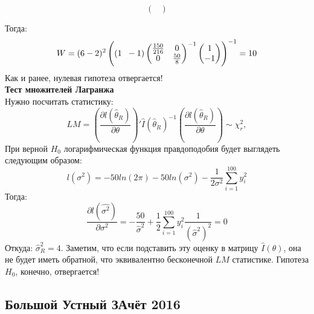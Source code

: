 \documentclass[12pt, a4paper]{article}
\theoremstyle{definition}
\begin{document}
\begin{enumerate}
\[\begin{pmatrix}
\end{pmatrix}
\]

Тогда:
\[
W = (6-2)^2\left((1 \hspace{2mm} -1) \begin{pmatrix}
\frac{150}{216} & 0 \\
0 & \frac{50}{8}
\end{pmatrix}^{-1}
 \begin{pmatrix}
1 \\
-1
\end{pmatrix} \right)^{-1} = 10
\]
Как и ранее, нулевая гипотеза отвергается! \\
\textbf{Тест множителей Лагранжа}\\
Нужно посчитать статистику:
\[
LM = \left(\frac{\partial l(\hat{\theta}_R)}{\partial \theta}\right)'\hat{I}(\hat{\theta}_R)^{-1}\left(\frac{\partial l(\hat{\theta}_R)}{\partial \theta}\right) \sim \chi^2_r,
\]
При верной $H_0$ логарифмическая функция правдоподобия будет выглядеть следующим образом:
\[
l(\sigma^2) = -50ln(2\pi) - 50ln(\sigma^2) - \frac{1}{2\sigma^2}\sum \limits_{i=1}^{100}y_i^2
\]
Тогда:
\[
\frac{\partial l(\hat{\sigma^2})}{\partial \sigma^2} = -\frac{50}{\hat{\sigma}^2} + \frac{1}{2}\sum\limits_{i=1}^{100}y_i^2\frac{1}{(\hat{\sigma}^2)^2} = 0
\]
Откуда: $\hat{\sigma}^2_{R} = 4$. Заметим, что если подставить эту оценку в матрицу $\hat{I}(\theta)$, она не будет иметь обратной, что эквивалентно бесконечной $LM$ статистике. Гипотеза $H_0$, конечно, отвергается!

\end{enumerate}



\subsection{Большой Устный ЗАчёт 2016}
\end{document}
